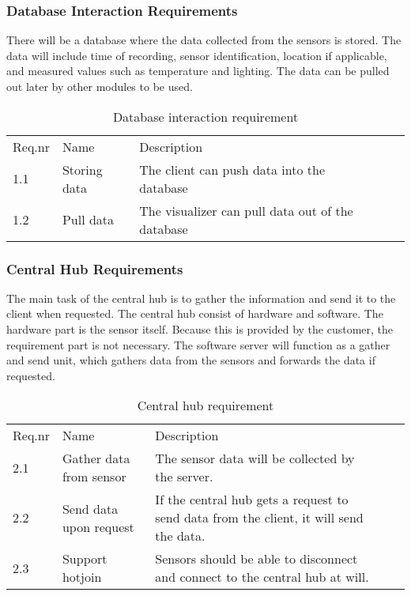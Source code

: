 \documentclass[../document]{subfiles}
\begin{document}
\subsubsection{Database Interaction Requirements}
There will be a database where the data collected from the sensors is stored. The data will include time of recording, sensor identification, location if applicable, and measured values such as temperature and lighting. The data can be pulled out later by other modules to be used. 

\begin{table}[H]
\caption{Database interaction requirement}
\centering
\begin{tabularx}{\textwidth}{|l|X|X|l|X|}
\hline
\\ \hline Req.nr
&Name
&Description
\\ \hline 1.1
&Storing data
&The client can push data into the database
\\ \hline 1.2
&Pull data
&The visualizer can pull data out of the database
\\ \hline 
\end{tabularx}
\end{table}

\subsubsection{Central Hub Requirements}
The main task of the central hub is to gather the information and send it to the client when requested. The central hub consist of hardware and software. The hardware part is the sensor itself. Because this is provided by the customer, the requirement part is not necessary. The software server will function as a gather and send unit, which gathers data from the sensors and forwards the data if requested.

\begin{table}[H]
\caption{Central hub requirement}
\centering
\begin{tabularx}{\textwidth}{|l|X|X|l|X|}
\hline
\\ \hline Req.nr
&Name
&Description
\\ \hline 2.1
&Gather data from sensor
&The sensor data will be collected by the server.
\\ \hline 2.2
&Send data upon request
&If the central hub gets a request to send data from the client, it will send the data.
\\ \hline 2.3
&Support hotjoin
&Sensors should be able to disconnect and connect to the central hub at will.
\\ \hline 
\end{tabularx}
\end{table}
\end{document}
